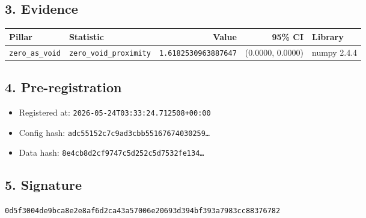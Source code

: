 \documentclass{article}
\begin{document}
\subsection*{3. Evidence}
\begin{tabular}{llrrl}\toprule
\textbf{Pillar} & \textbf{Statistic} & \textbf{Value} & \textbf{95\% CI} & \textbf{Library} \\\midrule
\texttt{zero\_as\_void} & \texttt{zero\_void\_proximity} & \texttt{1.6182530963887647} & (0.0000, 0.0000) & numpy 2.4.4 \\
\bottomrule\end{tabular}
\subsection*{4. Pre-registration}
\begin{itemize}
\item Registered at: \texttt{2026-05-24T03:33:24.712508+00:00}
\item Config hash: \texttt{adc55152c7c9ad3cbb55167674030259\dots}
\item Data hash: \texttt{8e4cb8d2cf9747c5d252c5d7532fe134\dots}
\end{itemize}
\subsection*{5. Signature}
\texttt{0d5f3004de9bca8e2e8af6d2ca43a57006e20693d394bf393a7983cc88376782}\\
\end{document}
